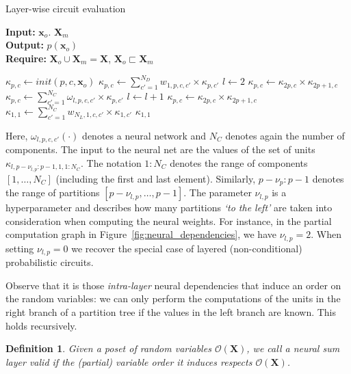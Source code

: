 \documentclass[letterpaper]{article} %
\newtheorem{definition}[theorem]{Definition}
\newcommand{\Xvars}{\ensuremath{\mathbf{X}}}
\newcommand{\xvars}{\ensuremath{\mathbf{x}}}
\newcommand{\poset}{\ensuremath{\mathcal{O}}}
\newcommand{\weight}{\ensuremath{w}}
\newcommand{\nweight}{\ensuremath{\omega}}
\newcommand{\component}{\ensuremath{{\kappa}}}
\begin{document}
\begin{algorithm}[t]
	\caption{Layer-wise circuit evaluation}
	\label{alg:layer}
	\hspace*{\algorithmicindent} \textbf{Input:} $\xvars_o$. $\Xvars_m$ \\
	\hspace*{\algorithmicindent} \textbf{Output:} $p(\xvars_o)$ \\
	\hspace*{\algorithmicindent} \textbf{Require:} $\Xvars_o {\cup} \Xvars_m {=} \Xvars$,  $\Xvars_o {\sqsubset} \Xvars_m$
	\begin{algorithmic}[1]
		\State $\component_{p,c} \gets init(p,c,\xvars_o)$
		\State $\component_{p,c} \gets
			\sum_{c'=1}^{N_D} \weight_{1,p,c,c'} \times \component_{p,c'}$ 
		\State $l \gets 2$
		\State $\component_{p,c} \gets \component_{2p,c} \times \component_{2p+1,c} $ 
		\State
		$ \component_{p,c}
			\gets
			\sum_{c'=1}^{N_C} \nweight_{l,p,c,c'}
			\times
			\component_{p,c'}
		$ 
		\State $l \gets l+1$
		\EndWhile
		\State $\component_{p,c} \gets \component_{2p,c} \times \component_{2p+1,c} $ 
		\State $\component_{1,1} \gets \sum_{c'=1}^{N_C} \weight_{N_L,1,c,c'} \times \component_{1,c'}$ 
		\State \Return $\component_{1,1}$
	\end{algorithmic}
\end{algorithm}



Here, $\nweight_{l,p,c,c'}(\cdot)$ denotes a neural network and $N_C$ denotes again the number of components. The input to the neural net are the values of the set of units $\component_{l, p-\nu_{l,p}{:}p-1, 1, 1{:}N_C}$. The notation $1{:}N_C$ denotes the range of components $[1,\dots,N_C]$ (including the first and last element). Similarly, $p{-}\nu_p{:}p{-}1$ denotes the range of partitions $[p{-}\nu_{l,p},\dots,p{-}1]$. The parameter $\nu_{l,p}$ is a hyperparameter and describes how many partitions \textit{`to the left'} are taken into consideration when computing the neural weights. For instance, in the partial computation graph in Figure~\ref{fig:neural_dependencies}, we have $\nu_{l,p}{=}2$. When setting $\nu_{l,p}{=}0$ we recover the special case of layered (non-conditional) probabilistic circuits.







Observe that it is those \textit{intra-layer} neural dependencies that induce an order on the random variables: we can only perform the computations of the units in the right branch of a partition tree if the values in the left branch are known. This holds recursively.
\begin{definition}
	Given a poset of random variables $\poset (\Xvars)$, we call a neural sum layer valid if the (partial) variable order it induces respects $\poset(\Xvars)$.
\end{definition}
\end{document}
